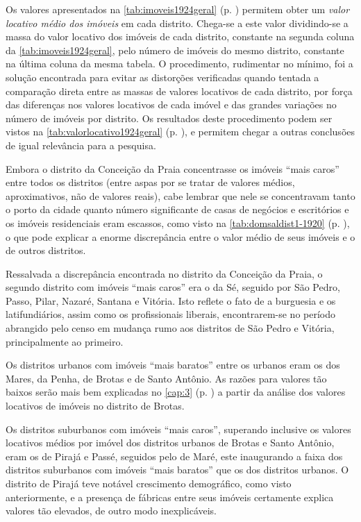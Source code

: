 Os valores apresentados na \autoref{tab:imoveis1924geral} (p. \pageref{tab:imoveis1924geral}) permitem obter um \textit{valor locativo médio dos imóveis} em cada distrito. Chega-se a este valor dividindo-se a massa do valor locativo dos imóveis de cada distrito, constante na segunda coluna da \autoref{tab:imoveis1924geral}, pelo número de imóveis do mesmo distrito, constante na última coluna da mesma tabela. O procedimento, rudimentar no mínimo, foi a solução encontrada para evitar as distorções verificadas quando tentada a comparação direta entre as massas de valores locativos de cada distrito, por força das diferenças nos valores locativos de cada imóvel e das grandes variações no número de imóveis por distrito. Os resultados deste procedimento podem ser vistos na \autoref{tab:valorlocativo1924geral} (p. \pageref{tab:valorlocativo1924geral}), e permitem chegar a outras conclusões de igual relevância para a pesquisa.



Embora o distrito da Conceição da Praia concentrasse os imóveis ``mais caros'' entre todos os distritos (entre aspas por se tratar de valores médios, aproximativos, não de valores reais), cabe lembrar que nele se concentravam tanto o porto da cidade quanto número significante de casas de negócios e escritórios e os imóveis residenciais eram escassos, como visto na \autoref{tab:domsaldist1-1920} (p. \pageref{tab:domsaldist1-1920}), o que pode explicar a enorme discrepância entre o valor médio de seus imóveis e o de outros distritos.

Ressalvada a discrepância encontrada no distrito da Conceição da Praia, o segundo distrito com imóveis ``mais caros'' era o da Sé, seguido por São Pedro, Passo, Pilar, Nazaré, Santana e Vitória. Isto reflete o fato de a burguesia e os latifundiários, assim como os profissionais liberais, encontrarem-se no período abrangido pelo censo em mudança rumo aos distritos de São Pedro e Vitória, principalmente ao primeiro.

Os distritos urbanos com imóveis ``mais baratos'' entre os urbanos eram os dos Mares, da Penha, de Brotas e de Santo Antônio. As razões para valores tão baixos serão mais bem explicadas no \autoref{cap:3} (p. \pageref{cap:3}) a partir da análise dos valores locativos de imóveis no distrito de Brotas.

Os distritos suburbanos com imóveis ``mais caros'', superando inclusive os valores locativos médios por imóvel dos distritos urbanos de Brotas e Santo Antônio, eram os de Pirajá e Passé, seguidos pelo de Maré, este inaugurando a faixa dos distritos suburbanos com imóveis ``mais baratos'' que os dos distritos urbanos. O distrito de Pirajá teve notável crescimento demográfico, como visto anteriormente, e a presença de fábricas entre seus imóveis certamente explica valores tão elevados, de outro modo inexplicáveis.

